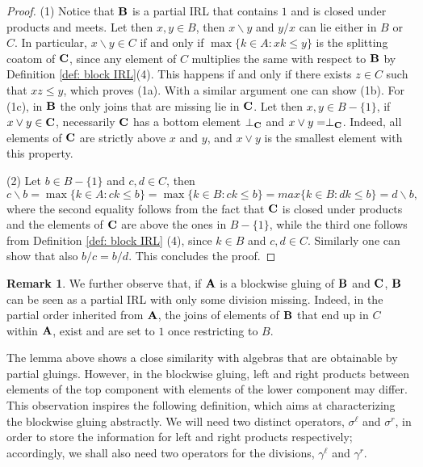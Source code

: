 \documentclass{amsart}
\theoremstyle{definition}
\newtheorem{remark}[theorem]{Remark}
\numberwithin{equation}{section}
\newcommand{\join}{\vee}
\newcommand{\alg}[1]{{\textbf{\upshape #1}}}  %
\newcommand{\sell}{\sigma^\ell}
\newcommand{\sr}{\sigma^r}
\newcommand{\gell}{\gamma^\ell}
\newcommand{\gr}{\gamma^r}
\begin{document}
	\begin{proof}
		(1) Notice that $\alg B$ is a partial IRL that contains $1$ and is closed under products and meets. Let then $x, y \in B$, then $x \backslash y$ and $y/x$ can lie either in $B$ or $C$. In particular, $x \backslash y \in C$ if and only if $\max \{k \in A : xk \leq y\}$ is the splitting coatom of $\alg C$, since any element of $C$ multiplies the same with respect to $\alg B$ by Definition \ref{def: block IRL}(4). This happens if and only if there exists $z \in C$ such that $xz \leq y$, which proves (1a). With a similar argument one can show (1b).
			For (1c), in $\alg B$ the only joins that  are missing lie in $\alg C$. Let then $x,y \in B-\{ 1\}$, if $x \join y \in \alg C$, necessarily $\alg C$ has a bottom element $\perp_\alg{C}$ and $x \join y = \perp_{\alg C}$. Indeed, all elements of $\alg C$ are strictly above $x$ and $y$, and $x \join y$ is the smallest element with this property.
		
       (2) Let $b \in B - \{1\}$ and $c,d \in C$, then $$c \backslash b= \max\{k \in A : ck \leq b\} = \max \{ k \in B : ck \leq b \}=max\{k \in B : dk \leq b\}=d \backslash b,$$ where the second equality follows from the fact that $\alg C$ is closed under products and the elements of $\alg C$ are above the ones in $B - \{1 \}$, while the third one follows from Definition \ref{def: block IRL} (4), since $k \in B $ and $c,d \in C$. Similarly one can show that also $b/c=b/d$. This concludes the proof.
   \end{proof}
   \begin{remark}\label{rem:div}
   	 We further observe that, if $\alg A$ is a blockwise gluing of $\alg B$ and $\alg C$, $\alg B$ can be seen as a partial IRL with only some division missing. Indeed, in the partial order inherited from $\alg A$, the joins of elements of $\alg B$ that end up in $C$ within $\alg A$, exist and are set to $1$ once restricting to $B$.
   \end{remark}
    
	The lemma above shows a close similarity with algebras that are obtainable by partial gluings. However, in the blockwise gluing, left and right products between elements of the top component with elements of the lower component may differ. This observation inspires the following definition, which aims at characterizing the blockwise gluing abstractly. We will need two distinct operators, $\sell$ and $\sr$, in order to store the information for left and right products respectively; accordingly, we shall also need two operators for the divisions, $\gell$ and $\gr$.
	
\end{document}
